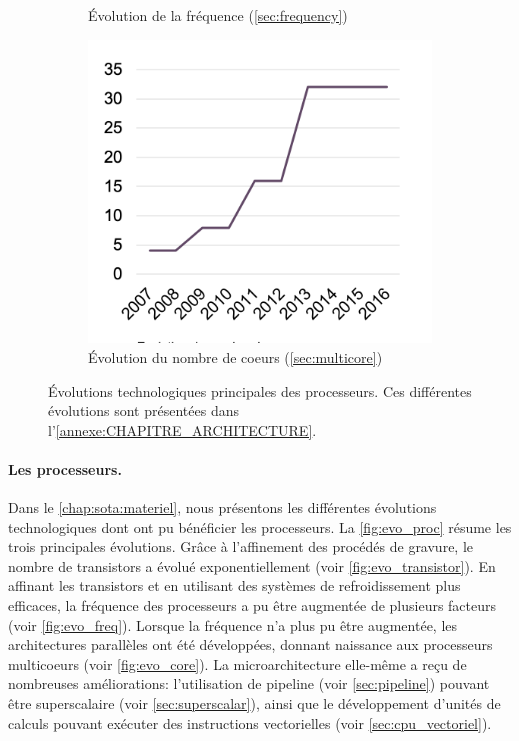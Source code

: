 \begin{figure}[t!]
\begin{subfigure}[t]{0.33\textwidth}
                \caption{\label{fig:evo_freq}Évolution de la fréquence (\autoref{sec:frequency})}
            \end{subfigure}\hfill
            \begin{subfigure}[t]{0.33\textwidth}
                    \centering
                    \includegraphics[width=\linewidth]{images/evo_core.png}
                    \caption{\label{fig:evo_core}Évolution du nombre de coeurs (\autoref{sec:multicore})}
            \end{subfigure}
            \caption{\label{fig:evo_proc}Évolutions technologiques principales des processeurs. Ces différentes évolutions sont présentées dans l'\autoref{annexe:CHAPITRE_ARCHITECTURE}.}
        \end{figure}
        
            \paragraph{Les processeurs.} Dans le \autoref{chap:sota:materiel}, nous présentons les différentes évolutions technologiques dont ont pu bénéficier les processeurs. La \autoref{fig:evo_proc} résume les trois principales évolutions.
            Grâce à l'affinement des procédés de gravure, le nombre de transistors a évolué exponentiellement (voir \autoref{fig:evo_transistor}).  
            En affinant les transistors et en utilisant des systèmes de refroidissement plus efficaces, la fréquence des processeurs a pu être augmentée de plusieurs facteurs (voir \autoref{fig:evo_freq}).
            Lorsque la fréquence n'a plus pu être augmentée, les architectures parallèles ont été développées, donnant naissance aux processeurs multicoeurs (voir \autoref{fig:evo_core}). La microarchitecture elle-même a reçu de nombreuses améliorations: l'utilisation de pipeline (voir \autoref{sec:pipeline}) pouvant être superscalaire (voir \autoref{sec:superscalar}), ainsi que le développement d'unités de calculs pouvant exécuter des instructions vectorielles (voir \autoref{sec:cpu_vectoriel}).
            
